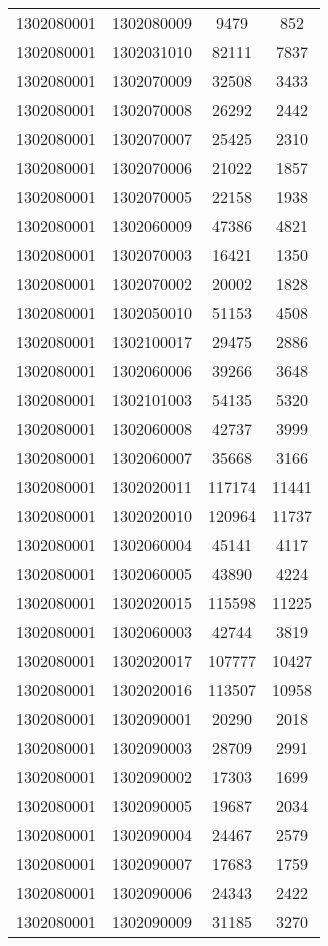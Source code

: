 \begin{longtable}{llcc}
1302080001 & 1302080009 & 9479 & 852\\
1302080001 & 1302031010 & 82111 & 7837\\
1302080001 & 1302070009 & 32508 & 3433\\
1302080001 & 1302070008 & 26292 & 2442\\
1302080001 & 1302070007 & 25425 & 2310\\
1302080001 & 1302070006 & 21022 & 1857\\
1302080001 & 1302070005 & 22158 & 1938\\
1302080001 & 1302060009 & 47386 & 4821\\
1302080001 & 1302070003 & 16421 & 1350\\
1302080001 & 1302070002 & 20002 & 1828\\
1302080001 & 1302050010 & 51153 & 4508\\
1302080001 & 1302100017 & 29475 & 2886\\
1302080001 & 1302060006 & 39266 & 3648\\
1302080001 & 1302101003 & 54135 & 5320\\
1302080001 & 1302060008 & 42737 & 3999\\
1302080001 & 1302060007 & 35668 & 3166\\
1302080001 & 1302020011 & 117174 & 11441\\
1302080001 & 1302020010 & 120964 & 11737\\
1302080001 & 1302060004 & 45141 & 4117\\
1302080001 & 1302060005 & 43890 & 4224\\
1302080001 & 1302020015 & 115598 & 11225\\
1302080001 & 1302060003 & 42744 & 3819\\
1302080001 & 1302020017 & 107777 & 10427\\
1302080001 & 1302020016 & 113507 & 10958\\
1302080001 & 1302090001 & 20290 & 2018\\
1302080001 & 1302090003 & 28709 & 2991\\
1302080001 & 1302090002 & 17303 & 1699\\
1302080001 & 1302090005 & 19687 & 2034\\
1302080001 & 1302090004 & 24467 & 2579\\
1302080001 & 1302090007 & 17683 & 1759\\
1302080001 & 1302090006 & 24343 & 2422\\
1302080001 & 1302090009 & 31185 & 3270\\

\end{longtable}
